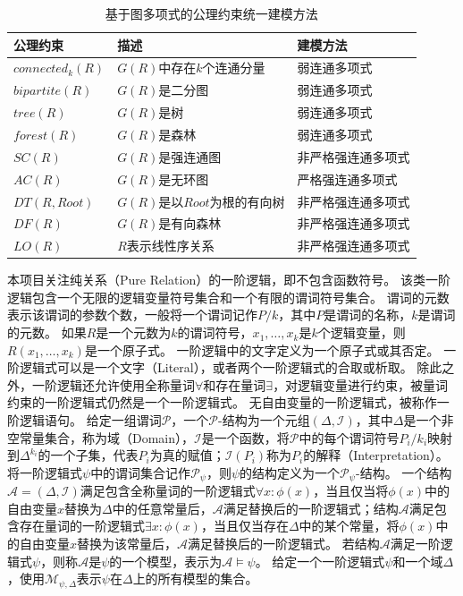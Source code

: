 \documentclass[12pt,UTF8,AutoFakeBold=3,a4paper]{ctexart} %
\newcommand{\formula}{\psi}
\newcommand{\domain}{\Delta}
\newcommand{\fomodels}[2]{\mathcal{M}_{#1, #2}}
\newcommand{\structure}{\mathcal{A}}
\begin{document}
\begin{table}[h]
  \centering
  \caption{基于图多项式的公理约束统一建模方法}\label{tab:axioms}
    \begin{tabular}{l|l|l}
      \hline
      \textbf{公理约束} & \textbf{描述} & \textbf{建模方法} \\
      \hline\hline
      $connected_k(R)$ & $G(R)$中存在$k$个连通分量 & 弱连通多项式 \\
      \hline
      $bipartite(R)$ & $G(R)$是二分图 & 弱连通多项式 \\
      \hline
      $tree(R)$ & $G(R)$是树 & 弱连通多项式 \\
      \hline
      $forest(R)$ & $G(R)$是森林 & 弱连通多项式 \\
      \hline\hline
      $SC(R)$ & $G(R)$是强连通图 & 非严格强连通多项式 \\
      \hline
      $AC(R)$ & $G(R)$是无环图 & 严格强连通多项式 \\
      \hline
      $DT(R, Root)$ & $G(R)$是以$Root$为根的有向树 & 非严格强连通多项式 \\ \hline
      $DF(R)$ & $G(R)$是有向森林 & 非严格强连通多项式 \\ \hline
      $LO(R)$ & $R$表示线性序关系 & 非严格强连通多项式 \\
      \hline
    \end{tabular}
\end{table}


本项目关注纯关系（Pure Relation）的一阶逻辑，即不包含函数符号。
该类一阶逻辑包含一个无限的逻辑变量符号集合和一个有限的谓词符号集合。
谓词的元数表示该谓词的参数个数，一般将一个谓词记作$P/k$，其中$P$是谓词的名称，$k$是谓词的元数。
如果$R$是一个元数为$k$的谓词符号，$x_1,\dots,x_k$是$k$个逻辑变量，则$R(x_1,\dots,x_k)$是一个原子式。
一阶逻辑中的文字定义为一个原子式或其否定。
一阶逻辑式可以是一个文字（Literal），或者两个一阶逻辑式的合取或析取。
除此之外，一阶逻辑还允许使用全称量词$\forall$和存在量词$\exists$，对逻辑变量进行约束，被量词约束的一阶逻辑式仍然是一个一阶逻辑式。
无自由变量的一阶逻辑式，被称作一阶逻辑语句。
给定一组谓词$\mathcal{P}$，一个$\mathcal{P}$-结构为一个元组$(\domain, \mathcal{I})$，其中$\domain$是一个非空常量集合，称为域（Domain），$\mathcal{I}$是一个函数，将$\mathcal{P}$中的每个谓词符号$P_i/k_i$映射到$\domain^{k_i}$的一个子集，代表$P_i$为真的赋值；$\mathcal{I}(P_i)$称为$P_i$的解释（Interpretation）。
将一阶逻辑式$\formula$中的谓词集合记作$\mathcal{P}_\formula$，则$\formula$的结构定义为一个$\mathcal{P}_\formula$-结构。
一个结构$\structure=(\domain, \mathcal{I})$满足包含全称量词的一阶逻辑式$\forall x: \phi(x)$，当且仅当将$\phi(x)$中的自由变量$x$替换为$\domain$中的任意常量后，$\structure$满足替换后的一阶逻辑式；结构$\structure$满足包含存在量词的一阶逻辑式$\exists x: \phi(x)$，当且仅当存在$\domain$中的某个常量，将$\phi(x)$中的自由变量$x$替换为该常量后，$\structure$满足替换后的一阶逻辑式。
若结构$\structure$满足一阶逻辑式$\formula$，则称$\structure$是$\formula$的一个模型，表示为$\structure\models\formula$。
给定一个一阶逻辑式$\formula$和一个域$\domain$，使用$\fomodels{\formula}{\domain}$表示$\formula$在$\domain$上的所有模型的集合。
\end{document}
